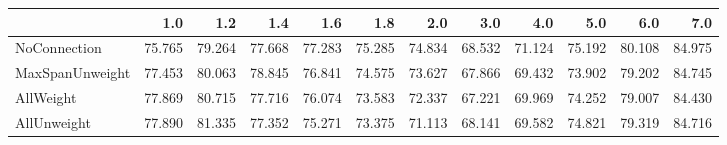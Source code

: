 \begin{tabular}{lrrrrrrrrrrr}
\toprule
{} &    1.0 &    1.2 &    1.4 &    1.6 &    1.8 &    2.0 &    3.0 &    4.0 &    5.0 &    6.0 &    7.0 \\
\midrule
NoConnection    & 75.765 & 79.264 & 77.668 & 77.283 & 75.285 & 74.834 & 68.532 & 71.124 & 75.192 & 80.108 & 84.975 \\
MaxSpanUnweight & 77.453 & 80.063 & 78.845 & 76.841 & 74.575 & 73.627 & 67.866 & 69.432 & 73.902 & 79.202 & 84.745 \\
AllWeight       & 77.869 & 80.715 & 77.716 & 76.074 & 73.583 & 72.337 & 67.221 & 69.969 & 74.252 & 79.007 & 84.430 \\
AllUnweight     & 77.890 & 81.335 & 77.352 & 75.271 & 73.375 & 71.113 & 68.141 & 69.582 & 74.821 & 79.319 & 84.716 \\
\bottomrule
\end{tabular}

